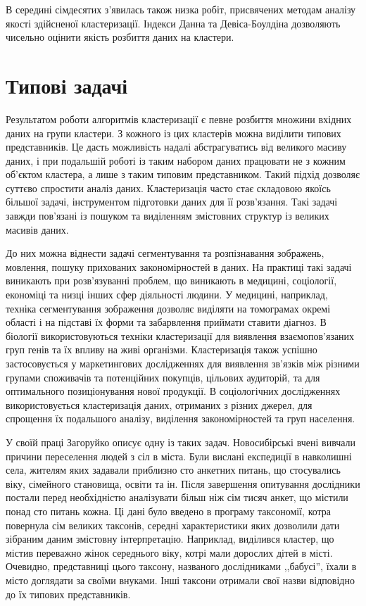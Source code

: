     В середині сімдесятих з'явилась також низка робіт, присвячених методам аналізу якості здійсненої кластеризації. Індекси Данна \cite{Dunn} та  Девіса-Боулдіна \cite{DavisBouldin} дозволяють чисельно оцінити якість розбиття даних на кластери.

\section{Типові задачі}
    Результатом роботи алгоритмів кластеризації є певне розбиття множини вхідних даних на групи кластери. З кожного із цих кластерів можна виділити типових представників. Це дасть можливість надалі абстрагуватись від великого масиву даних, і при подальшій роботі із таким набором даних працювати не з кожним об’єктом кластера, а лише з таким типовим представником. Такий підхід дозволяє суттєво спростити аналіз даних. Кластеризація часто стає складовою якоїсь більшої задачі, інструментом підготовки даних для її розв'язання. Такі задачі завжди пов'язані із пошуком та виділенням змістовних структур із великих масивів даних. 

    До них можна віднести задачі сегментування та розпізнавання зображень, мовлення, пошуку прихованих закономірностей в даних. На практиці такі задачі виникають при розв'язуванні проблем, що виникають в медицині, соціології, економіці та низці інших сфер діяльності людини. 
    У медицині, наприклад, техніка сегментування зображення дозволяє виділяти на томограмах окремі області і на підставі їх форми та забарвлення приймати ставити діагноз. В біології використовуються техніки кластеризації для виявлення взаємопов'язаних груп генів та їх впливу на живі організми. Кластеризація також успішно застосовується у маркетингових дослідженнях для виявлення зв'язків між різними групами споживачів та потенційних покупців, цільових аудиторій, та для оптимального позиціонування нової продукції. 
    В соціологічних дослідженнях використовується кластеризація даних, отриманих з різних джерел, для спрощення їх подальшого аналізу, виділення закономірностей та груп населення. 

    У своїй праці \cite{Zagorujko} Загоруйко описує одну із таких задач. Новосибірські вчені вивчали причини переселення людей з сіл в міста. Були вислані експедиції в навколишні села, жителям яких задавали приблизно сто анкетних питань, що стосувались віку, сімейного становища, освіти та ін. Після завершення опитування дослідники постали перед необхідністю аналізувати більш ніж сім тисяч анкет, що містили понад сто питань кожна. 
    Ці дані було введено в програму таксономії, котра повернула сім великих таксонів, середні характеристики яких дозволили дати зібраним даним змістовну інтерпретацію. Наприклад, виділився кластер, що містив переважно жінок середнього віку, котрі мали дорослих дітей в місті. Очевидно, представниці цього таксону, названого дослідниками ,,бабусі'', їхали в місто доглядати за своїми внуками. Інші таксони отримали свої назви відповідно до їх типових представників.
    
